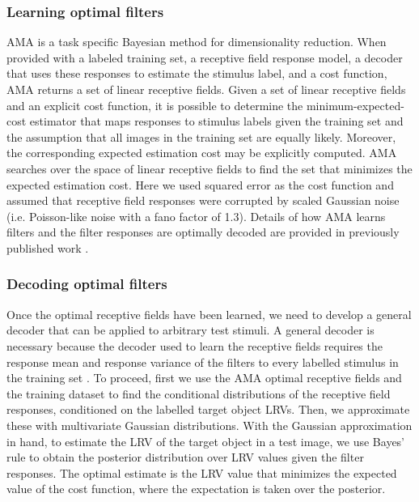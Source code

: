 \documentclass{jov}
\begin{document}
\subsubsection*{Learning optimal filters}
AMA is a task specific Bayesian method for dimensionality reduction.
When provided with a labeled training set, a receptive field response model, a decoder that uses these responses to estimate the stimulus label, and a cost function, AMA returns a set of linear receptive fields.
Given a set of linear receptive fields and an explicit cost function, it is possible to determine the minimum-expected-cost estimator that maps responses to stimulus labels given the training set and the 
assumption that all images in the training set are equally likely.
Moreover, the corresponding expected estimation cost may be explicitly computed.
AMA searches over the space of linear receptive fields to find the set that minimizes the expected estimation cost.
Here we used squared error as the cost function and assumed that receptive field responses were corrupted by scaled Gaussian noise (i.e. Poisson-like noise with a fano factor of 1.3).
Details of how AMA learns filters and the filter responses are optimally decoded are provided in previously published work \cite{geisler2009optimal,burge2017accuracy,jaini2017linking}.

\subsubsection*{Decoding optimal filters}

Once the optimal receptive fields have been learned, we need to develop a general decoder that can be applied to arbitrary test stimuli.
A general decoder is necessary because the decoder used to learn the receptive fields requires the response mean and response variance of the filters to every labelled stimulus in the training set \cite{geisler2009optimal,burge2017accuracy}.
To proceed, first we use the AMA optimal receptive fields and the training dataset to find the conditional distributions of the receptive field responses, conditioned on the labelled target object LRVs.
Then, we approximate these with multivariate Gaussian distributions.
With the Gaussian approximation in hand, 
to estimate the LRV of the target object in a test image, we use Bayes' rule to obtain the posterior distribution over LRV values given the filter responses.
The optimal estimate is the LRV value that minimizes the expected value of the cost function, where the expectation is taken over the posterior.
\end{document}
